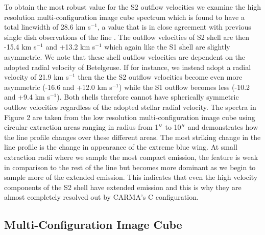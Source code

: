 \documentclass[apj]{emulateapj}
\begin{document}
To obtain the most robust value for the S2 outflow velocities we examine the high resolution multi-configuration image cube spectrum which is found to have a total linewidth of 28.6 km s${}^{-1}$, a value that is in close agreement with previous single dish observations of the line \citep{1980ApJ...242L..25K, 1987ApJ...313..400H, 1994ApJ...424L.127H}. The outflow velocities of S2 shell are then -15.4 km s${}^{-1}$ and +13.2 km s${}^{-1}$ which again like the S1 shell are slightly asymmetric. We note that these shell outflow velocities are dependent on the adopted radial velocity of Betelgeuse. If for instance, we instead adopt a radial velocity of 21.9 km s${}^{-1}$ \citep{2005A&A...430..165F} then the the S2 outflow velocities become even more asymmetric (-16.6 and +12.0 km s${}^{-1}$) while the S1 outflow becomes less (-10.2 and +9.4 km s${}^{-1}$). Both shells therefore cannot have spherically symmetric outflow velocities regardless of the adopted stellar radial velocity. The spectra in Figure 2 are taken from the low resolution multi-configuration image cube using circular extraction areas ranging in radius from 1$\mbox{$^{\prime\prime}$}$ to 10$\mbox{$^{\prime\prime}$}$ and demonstrates how the line profile changes over these different areas. The most striking change in the line profile is the change in appearance of the extreme blue wing. At small extraction radii where we sample the most compact emission, the feature is weak in comparison to the rest of the line but becomes more dominant as we begin to sample more of the extended emission. This indicates that even the high velocity components of the S2 shell have extended emission and this is why they are almost completely resolved out by CARMA's C configuration.

\subsection{Multi-Configuration Image Cube} \label{results2} 
\end{document}
